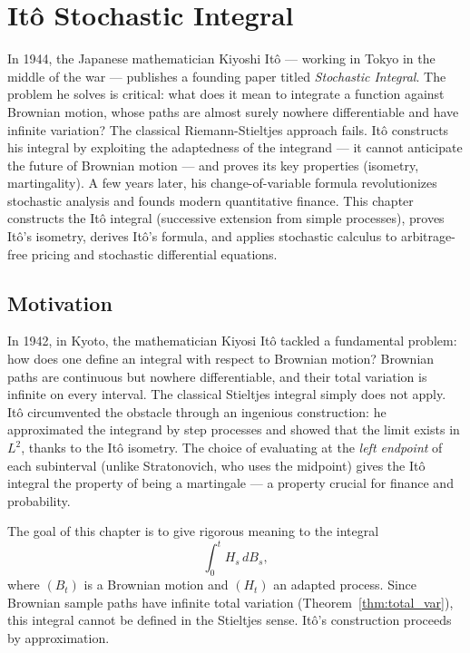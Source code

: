 \chapter{It\^o Stochastic Integral}
\label{ch:ito_integral}

In 1944, the Japanese mathematician Kiyoshi Itô --- working in Tokyo in the middle of the war --- publishes a founding paper titled \emph{Stochastic Integral}. The problem he solves is critical: what does it mean to integrate a function against Brownian motion, whose paths are almost surely nowhere differentiable and have infinite variation? The classical Riemann-Stieltjes approach fails. Itô constructs his integral by exploiting the adaptedness of the integrand --- it cannot anticipate the future of Brownian motion --- and proves its key properties (isometry, martingality). A few years later, his change-of-variable formula revolutionizes stochastic analysis and founds modern quantitative finance. This chapter constructs the Itô integral (successive extension from simple processes), proves Itô's isometry, derives Itô's formula, and applies stochastic calculus to arbitrage-free pricing and stochastic differential equations.

\section{Motivation}

In 1942, in Kyoto, the mathematician Kiyosi It\^o tackled a fundamental problem: how does one define an integral with respect to Brownian motion? Brownian paths are continuous but nowhere differentiable, and their total variation is infinite on every interval. The classical Stieltjes integral simply does not apply. It\^o circumvented the obstacle through an ingenious construction: he approximated the integrand by step processes and showed that the limit exists in $L^2$, thanks to the It\^o isometry. The choice of evaluating at the \emph{left endpoint} of each subinterval (unlike Stratonovich, who uses the midpoint) gives the It\^o integral the property of being a martingale --- a property crucial for finance and probability.

The goal of this chapter is to give rigorous meaning to the integral
\[
  \int_0^t H_s \, dB_s,
\]
where $(B_t)$ is a Brownian motion and $(H_t)$ an adapted process. Since
Brownian sample paths have infinite total variation
(Theorem~\ref{thm:total_var}), this integral cannot be defined in the Stieltjes
sense. It\^o's construction proceeds by approximation.

